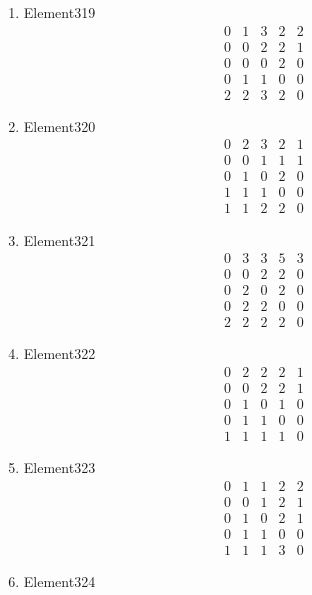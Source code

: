 \documentclass[12pt]{article}
\begin{document}
\begin{multicols}{3}
\begin{enumerate}
\item Element319
\begin{equation*}
\begin{array}{ccccc}
0&1&3&2&2\\
0&0&2&2&1\\
0&0&0&2&0\\
0&1&1&0&0\\
2&2&3&2&0
\end{array}
\end{equation*}
\item Element320
\begin{equation*}
\begin{array}{ccccc}
0&2&3&2&1\\
0&0&1&1&1\\
0&1&0&2&0\\
1&1&1&0&0\\
1&1&2&2&0
\end{array}
\end{equation*}
\item Element321
\begin{equation*}
\begin{array}{ccccc}
0&3&3&5&3\\
0&0&2&2&0\\
0&2&0&2&0\\
0&2&2&0&0\\
2&2&2&2&0
\end{array}
\end{equation*}
\item Element322
\begin{equation*}
\begin{array}{ccccc}
0&2&2&2&1\\
0&0&2&2&1\\
0&1&0&1&0\\
0&1&1&0&0\\
1&1&1&1&0
\end{array}
\end{equation*}
\item Element323
\begin{equation*}
\begin{array}{ccccc}
0&1&1&2&2\\
0&0&1&2&1\\
0&1&0&2&1\\
0&1&1&0&0\\
1&1&1&3&0
\end{array}
\end{equation*}
\item Element324
\begin{equation*}

\end{equation*}
\end{enumerate}
\end{multicols}
\end{document}
